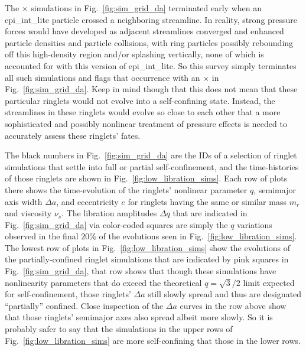 \documentclass[preprint]{aastex62}
\begin{document}
The $\times$ simulations in Fig.\ \ref{fig:sim_grid_da}
terminated early when an epi\_int\_lite particle crossed a 
neighboring streamline. In reality, strong 
pressure forces would have developed as adjacent streamlines converged
and enhanced particle densities and particle collisions, with ring particles
possibly rebounding off this high-density region and/or splashing vertically,
none of which is accounted for with this version of epi\_int\_lite. 
So this survey simply terminates all such simulations and flags that occurrence with an 
$\times$ in Fig.\ \ref{fig:sim_grid_da}. Keep in mind though that this does not mean
that these particular ringlets would not evolve into a self-confining state. Instead,
the streamlines in these ringlets would evolve so close to each other that a more sophisticated
and possibly nonlinear treatment of pressure effects is needed 
to accurately assess these ringlets' fates.

The black numbers in Fig.\ \ref{fig:sim_grid_da} are the IDs of a selection of 
ringlet simulations that settle into full or partial self-confinement, 
and the time-histories of those ringlets are
shown in Fig.\ \ref{fig:low_libration_sims}. Each row of plots there shows
the time-evolution of the ringlets' nonlinear parameter $q$, semimajor axis width
$\Delta a$, and eccentricity $e$ for ringlets having the same or similar
mass $m_r$ and viscosity $\nu_s$. The libration amplitudes $\Delta q$
that are indicated in Fig.\ \ref{fig:sim_grid_da} via color-coded squares are simply
the $q$ variations observed in the final $20\%$ of the evolutions
seen in Fig.\ \ref{fig:low_libration_sims}.
The lowest row of plots in Fig.\ \ref{fig:low_libration_sims}
show the evolutions of the partially-confined ringlet simulations that are
indicated  by pink squares in Fig.\ \ref{fig:sim_grid_da}, that row
shows that though these simulations have nonlinearity parameters
that do exceed the theoretical $q=\sqrt{3}/2$ limit expected for self-confinement,
those ringlets' $\Delta a$ still slowly spread and thus are designated
``partially'' confined.  Close inspection
of the $\Delta a$ curves in the row above show that those ringlets' semimajor axes
also spread albeit more slowly. So it is probably safer to say that the
simulations in the upper rows of Fig.\ \ref{fig:low_libration_sims}
are more self-confining that those in the lower rows.
\end{document}
